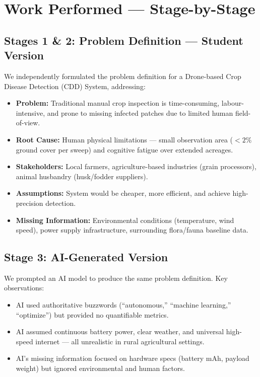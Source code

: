 \documentclass[11pt, a4paper]{article}
\begin{document}
\section{Work Performed --- Stage-by-Stage}

\subsection{Stages 1 \& 2: Problem Definition --- Student Version}
We independently formulated the problem definition for a Drone-based Crop Disease Detection (CDD) System, addressing:

\begin{itemize}[nosep]
    \item \textbf{Problem:} Traditional manual crop inspection is time-consuming, labour-intensive, and prone to missing infected patches due to limited human field-of-view.
    \item \textbf{Root Cause:} Human physical limitations --- small observation area ($< 2\%$ ground cover per sweep) and cognitive fatigue over extended acreages.
    \item \textbf{Stakeholders:} Local farmers, agriculture-based industries (grain processors), animal husbandry (husk/fodder suppliers).
    \item \textbf{Assumptions:} System would be cheaper, more efficient, and achieve high-precision detection.
    \item \textbf{Missing Information:} Environmental conditions (temperature, wind speed), power supply infrastructure, surrounding flora/fauna baseline data.
\end{itemize}

\subsection{Stage 3: AI-Generated Version}
We prompted an AI model to produce the same problem definition. Key observations:
\begin{itemize}[nosep]
    \item AI used authoritative buzzwords (``autonomous,'' ``machine learning,'' ``optimize'') but provided no quantifiable metrics.
    \item AI assumed continuous battery power, clear weather, and universal high-speed internet --- all unrealistic in rural agricultural settings.
    \item AI's missing information focused on hardware specs (battery mAh, payload weight) but ignored environmental and human factors.
\end{itemize}
\end{document}
